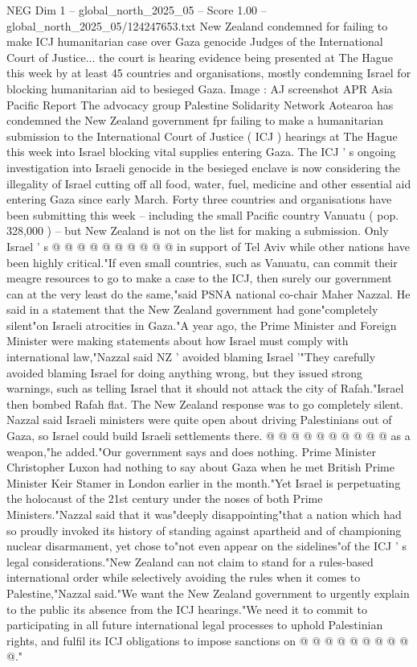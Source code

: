 \begin{textsample}{NEG Dim 1 – global\_north\_2025\_05 – Score 1.00 – global\_north\_2025\_05/124247653.txt}  \label{ex:f1_neg_081}
New Zealand condemned for failing to make ICJ humanitarian case over Gaza genocide Judges of the International Court of Justice... the court is hearing evidence being presented at The Hague this week by at least 45 countries and organisations, mostly condemning Israel for blocking humanitarian aid to besieged Gaza.
Image : AJ screenshot APR Asia Pacific Report The advocacy group Palestine Solidarity Network Aotearoa has condemned the New Zealand government fpr failing to make a humanitarian submission to the International Court of Justice ( ICJ ) hearings at The Hague this week into Israel blocking vital supplies entering Gaza.
The ICJ ' s ongoing investigation into Israeli genocide in the besieged enclave is now considering the illegality of Israel cutting off all food, water, fuel, medicine and other essential aid entering Gaza since early March.
Forty three countries and organisations have been submitting this week -- including the small Pacific country Vanuatu ( pop. 328,000 ) -- but New Zealand is not on the list for making a submission.
Only Israel ' s @ @ @ @ @ @ @ @ @ @ in support of Tel Aviv while other nations have been highly critical."If even small countries, such as Vanuatu, can commit their meagre resources to go to make a case to the ICJ, then surely our government can at the very least do the same,"said PSNA national co-chair Maher Nazzal.
He said in a statement that the New Zealand government had gone"completely silent"on Israeli atrocities in Gaza."A year ago, the Prime Minister and Foreign Minister were making statements about how Israel must comply with international law,"Nazzal said NZ ' avoided blaming Israel '"They carefully avoided blaming Israel for doing anything wrong, but they issued strong warnings, such as telling Israel that it should not attack the city of Rafah."Israel then bombed Rafah flat.
The New Zealand response was to go completely silent.
Nazzal said Israeli ministers were quite open about driving Palestinians out of Gaza, so Israel could build Israeli settlements there. @ @ @ @ @ @ @ @ @ @ as a weapon,"he added."Our government says and does nothing.
Prime Minister Christopher Luxon had nothing to say about Gaza when he met British Prime Minister Keir Stamer in London earlier in the month."Yet Israel is perpetuating the holocaust of the 21st century under the noses of both Prime Ministers."Nazzal said that it was"deeply disappointing"that a nation which had so proudly invoked its history of standing against apartheid and of championing nuclear disarmament, yet chose to"not even appear on the sidelines"of the ICJ ' s legal considerations."New Zealand can not claim to stand for a rules-based international order while selectively avoiding the rules when it comes to Palestine,"Nazzal said."We want the New Zealand government to urgently explain to the public its absence from the ICJ hearings."We need it to commit to participating in all future international legal processes to uphold Palestinian rights, and fulfil its ICJ obligations to impose sanctions on @ @ @ @ @ @ @ @ @ @."

\end{textsample}
